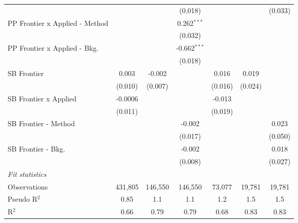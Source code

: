 \begin{tabular}{lcccccc}
                                  &                &                & (0.018)        &                &               & (0.033)\\   
   PP Frontier x Applied - Method &                &                & 0.262$^{***}$  &                &               &   \\   
                                  &                &                & (0.032)        &                &               &   \\   
   PP Frontier x Applied - Bkg.   &                &                & -0.662$^{***}$ &                &               &   \\   
                                  &                &                & (0.018)        &                &               &   \\   
   SB Frontier                    & 0.003          & -0.002         &                & 0.016          & 0.019         &   \\   
                                  & (0.010)        & (0.007)        &                & (0.016)        & (0.024)       &   \\   
   SB Frontier x Applied          & -0.0006        &                &                & -0.013         &               &   \\   
                                  & (0.011)        &                &                & (0.019)        &               &   \\   
   SB Frontier - Method           &                &                & -0.002         &                &               & 0.023\\   
                                  &                &                & (0.017)        &                &               & (0.050)\\   
   SB Frontier - Bkg.             &                &                & -0.002         &                &               & 0.018\\   
                                  &                &                & (0.008)        &                &               & (0.027)\\   
   \midrule
   \emph{Fit statistics}\\
   Observations                   & 431,805        & 146,550        & 146,550        & 73,077         & 19,781        & 19,781\\  
   Pseudo R$^2$                   & 0.85           & 1.1            & 1.1            & 1.2            & 1.5           & 1.5\\  
   R$^2$                          & 0.66           & 0.79           & 0.79           & 0.68           & 0.83          & 0.83\\  
   

\end{tabular}
